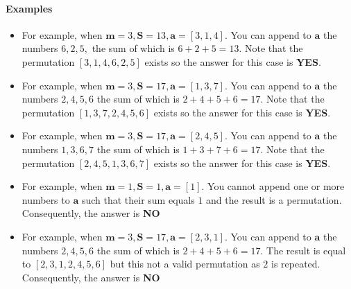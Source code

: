 \documentclass[a4paper]{exam}
\begin{document}
\begin{questions}
    \paragraph{Examples}
    \begin{itemize}
        \item For example, when $\mathbf{m}=3 ,\mathbf{S}=13,\mathbf{a}=[3,1,4]$. You can append to $\mathbf{a}$ the numbers $6,2,5,$ the sum of which is $6+2+5=13$. Note that the permutation $[3,1,4,6,2,5]$ exists so the answer for this case is \textbf{YES}.
        \item For example, when $\mathbf{m}=3 ,\mathbf{S}=17,\mathbf{a}=[1,3,7]$. You can append to $\mathbf{a}$ the numbers $2,4,5,6$ the sum of which is $2+4+5+6=17$. Note that the permutation $[1,3,7,2,4,5,6]$ exists so the answer for this case is \textbf{YES}.
        \item For example, when $\mathbf{m}=3 ,\mathbf{S}=17,\mathbf{a}=[2,4,5]$. You can append to $\mathbf{a}$ the numbers $1,3,6,7$ the sum of which is $1+3+7+6=17$. Note that the permutation $[2,4,5,1,3,6,7]$ exists so the answer for this case is \textbf{YES}.
        \item For example, when $\mathbf{m}=1 ,\mathbf{S}=1,\mathbf{a}=[1]$. You cannot append one or more numbers to $\mathbf{a}$ such that their sum equals $1$ and the result is a permutation. Consequently, the answer is \textbf{NO}
        \item For example, when $\mathbf{m}=3 ,\mathbf{S}=17,\mathbf{a}=[2,3,1]$. You can append to $\mathbf{a}$ the numbers $2,4,5,6$ the sum of which is $2+4+5+6=17$. The result is equal to $[2,3,1,2,4,5,6]$ but this not a valid permutation as $2$ is repeated. Consequently,  the answer is \textbf{NO}
        
    \end{itemize}
   

\end{questions}
\end{document}
